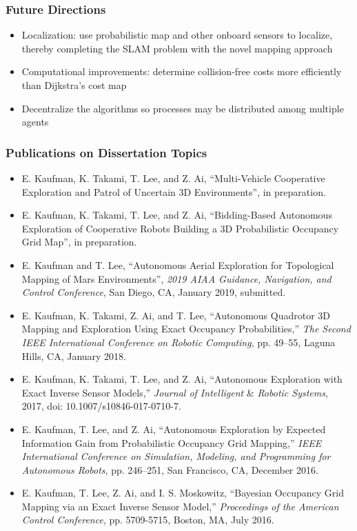 \documentclass[11pt,professionalfonts,hyperref={pdftex,pdfpagemode=none,pdfstartview=FitH}]{beamer}
\begin{document}
\begin{frame}
\frametitle{Future Directions}
	\begin{itemize}
		\item Localization: use probabilistic map and other onboard sensors to localize, thereby completing the SLAM problem with the novel mapping approach
		\item Computational improvements: determine collision-free costs more efficiently than Dijkstra's cost map
		\item Decentralize the algorithms so processes may be distributed among multiple agents
	\end{itemize}
\end{frame}


\begin{frame}
\frametitle{Publications on Dissertation Topics}
{\tiny 
\begin{itemize}
	\item E. Kaufman, K. Takami, T. Lee, and Z. Ai, ``Multi-Vehicle Cooperative Exploration and Patrol of Uncertain 3D Environments'', in preparation.
	\item E. Kaufman, K. Takami, T. Lee, and Z. Ai, ``Bidding-Based Autonomous Exploration of Cooperative Robots Building a 3D Probabilistic Occupancy Grid Map'', in preparation.
	\item E. Kaufman and T. Lee, ``Autonomous Aerial Exploration for Topological Mapping of Mars Environments'', \textit{2019 AIAA Guidance, Navigation, and Control Conference}, San Diego, CA, January 2019, submitted.
	\item E. Kaufman, K. Takami, Z. Ai, and T. Lee, ``Autonomous Quadrotor 3D Mapping and Exploration Using Exact Occupancy Probabilities,'' \textit{The Second IEEE International Conference on Robotic Computing}, pp. 49--55, Laguna Hills, CA, January 2018.
	\item E. Kaufman, K. Takami, T. Lee, and Z. Ai, ``Autonomous Exploration with Exact Inverse Sensor Models,'' \textit{Journal of Intelligent }\&\textit{ Robotic Systems}, 2017, doi: 10.1007/s10846-017-0710-7.
	\item E. Kaufman, T. Lee, and Z. Ai, ``Autonomous Exploration by Expected Information Gain from Probabilistic Occupancy Grid Mapping,'' \textit{IEEE International Conference on Simulation, Modeling, and Programming for Autonomous Robots}, pp. 246--251, San Francisco, CA, December 2016.
	\item E. Kaufman, T. Lee, Z. Ai, and I. S. Moskowitz, ``Bayesian Occupancy Grid Mapping via an Exact Inverse Sensor Model,'' \textit{Proceedings of the American Control Conference}, pp. 5709-5715, Boston, MA, July 2016.
\end{itemize}
}
\end{frame}
\end{document}
